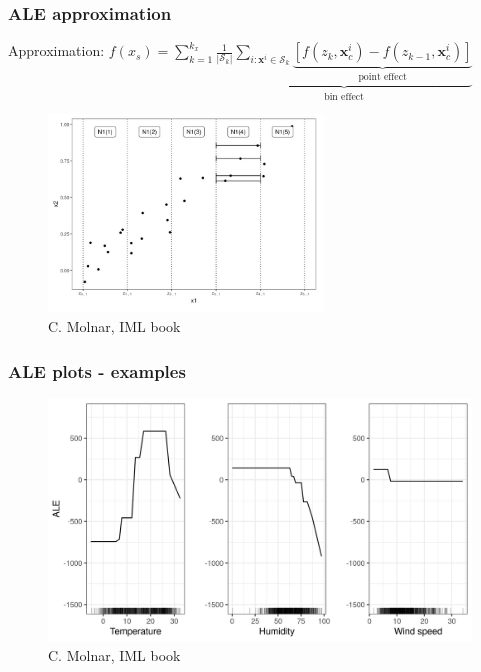 \documentclass{beamer}
\newcommand{\Vx}{\mathbf{x}}
\begin{document}
\begin{frame}
  \frametitle{ALE approximation}
  Approximation: \(f(x_s) = \sum\limits_{k=1}^{k_x}
  \underbrace{\frac{1}{|\mathcal{S}_k|} \sum_{i:\Vx^i \in \mathcal{S}_k}
    \underbrace{[f(z_k, \Vx^i_c) - f(z_{k-1}, \Vx^i_c)]}_{\text{point
        effect}}}_{\text{bin effect}} \)

  \begin{figure}[ht]
    \centering
    \includegraphics[width=0.65\textwidth]{./figures/ale_bins_iml.png}
    \caption{\footnotesize C. Molnar, IML book}
  \end{figure}
\end{frame}

\begin{frame}
  \frametitle{ALE plots - examples}
  \begin{figure}
    \includegraphics[width=1\textwidth]{ale-bike-1}
    \caption{\footnotesize C. Molnar, IML book}
  \end{figure}
\end{frame}
\end{document}
